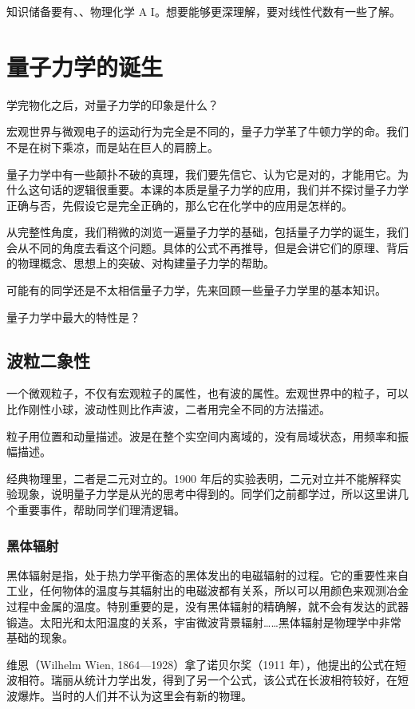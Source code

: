 知识储备要有、、物理化学 A I。想要能够更深理解，要对线性代数有一些了解。

\chapter{量子力学的诞生}

学完物化之后，对量子力学的印象是什么？

宏观世界与微观电子的运动行为完全是不同的，量子力学革了牛顿力学的命。我们不是在树下乘凉，而是站在巨人的肩膀上。

量子力学中有一些颠扑不破的真理，我们要先信它、认为它是对的，才能用它。为什么这句话的逻辑很重要。本课的本质是量子力学的应用，我们并不探讨量子力学正确与否，先假设它是完全正确的，那么它在化学中的应用是怎样的。

从完整性角度，我们稍微的浏览一遍量子力学的基础，包括量子力学的诞生，我们会从不同的角度去看这个问题。具体的公式不再推导，但是会讲它们的原理、背后的物理概念、思想上的突破、对构建量子力学的帮助。

可能有的同学还是不太相信量子力学，先来回顾一些量子力学里的基本知识。

量子力学中最大的特性是？

\section{波粒二象性}

一个微观粒子，不仅有宏观粒子的属性，也有波的属性。宏观世界中的粒子，可以比作刚性小球，波动性则比作声波，二者用完全不同的方法描述。

粒子用位置和动量描述。波是在整个实空间内离域的，没有局域状态，用频率和振幅描述。

经典物理里，二者是二元对立的。1900 年后的实验表明，二元对立并不能解释实验现象，说明量子力学是从光的思考中得到的。同学们之前都学过，所以这里讲几个重要事件，帮助同学们理清逻辑。

\subsection{黑体辐射}
黑体辐射是指，处于热力学平衡态的黑体发出的电磁辐射的过程。它的重要性来自工业，任何物体的温度与其辐射出的电磁波都有关系，所以可以用颜色来观测冶金过程中金属的温度。特别重要的是，没有黑体辐射的精确解，就不会有发达的武器锻造。太阳光和太阳温度的关系，宇宙微波背景辐射……黑体辐射是物理学中非常基础的现象。

维恩（Wilhelm Wien, 1864---1928）拿了诺贝尔奖（1911 年），他提出的公式在短波相符。瑞丽从统计力学出发，得到了另一个公式，该公式在长波相符较好，在短波爆炸。当时的人们并不认为这里会有新的物理。

